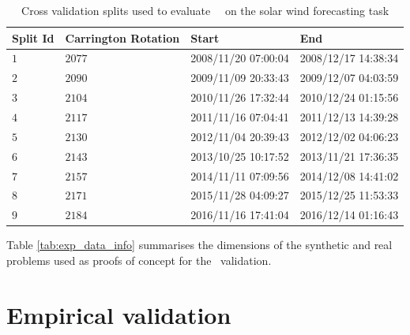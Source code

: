 \begin{table}[ht]
  \centering
  \caption{Cross validation splits used to evaluate \ \XX \ on the solar wind forecasting task}
  \label{table:dtlrsplits}
  \begin{tabular}{llll}
  \hline
  \textbf{Split Id} & \textbf{Carrington Rotation} & \textbf{Start} & \textbf{End}\\ \hline
  $1$ & $2077$ & 2008/11/20 07:00:04 & 2008/12/17 14:38:34  \\
  $2$ & $2090$ & 2009/11/09 20:33:43 & 2009/12/07 04:03:59  \\
  $3$ & $2104$ & 2010/11/26 17:32:44 & 2010/12/24 01:15:56  \\
  $4$ & $2117$ & 2011/11/16 07:04:41 & 2011/12/13 14:39:28  \\
  $5$ & $2130$ & 2012/11/04 20:39:43 & 2012/12/02 04:06:23  \\
  $6$ & $2143$ & 2013/10/25 10:17:52 & 2013/11/21 17:36:35  \\
  $7$ & $2157$ & 2014/11/11 07:09:56 & 2014/12/08 14:41:02  \\
  $8$ & $2171$ & 2015/11/28 04:09:27 & 2015/12/25 11:53:33  \\
  $9$ & $2184$ & 2016/11/16 17:41:04 & 2016/12/14 01:16:43  \\
  \hline
  \end{tabular}
  \end{table}
%
Table \ref{tab:exp_data_info} summarises the dimensions of the synthetic and real problems used as 
proofs of concept for the \XX\ validation.

\section{Empirical validation}\label{sec:proofconcept}

